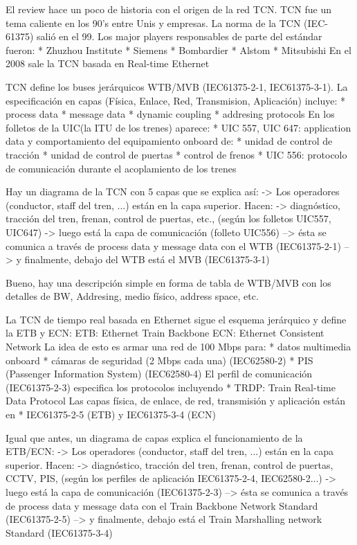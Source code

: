 \documentclass[
11pt, %
]{charter}
\begin{document}
El review hace un poco de historia con el origen de la red TCN.
TCN fue un tema caliente en los 90's entre Unis y empresas.
La norma de la TCN (IEC-61375) salió en el 99.
Los major players responsables de parte del estándar fueron:
* Zhuzhou Institute
* Siemens
* Bombardier
* Alstom
* Mitsubishi
En el 2008  sale la TCN basada en Real-time Ethernet


TCN define los buses jerárquicos WTB/MVB (IEC61375-2-1, IEC61375-3-1).
La especificación en capas (Física, Enlace, Red, Transmision, Aplicación) incluye:
* process data
* message data
* dynamic coupling
* addresing protocols
En los folletos de la UIC(la ITU de los trenes) aparece:
* UIC 557, UIC 647: application data y comportamiento del equipamiento onboard de:
* unidad de control de tracción
* unidad de control de puertas
* control de frenos
* UIC 556: protocolo de comunicación durante el acoplamiento de los trenes

Hay un diagrama de la TCN con 5 capas que se explica así:
-> Los operadores (conductor, staff del tren, ...) están en la capa superior. Hacen:
-> diagnóstico, tracción del tren, frenan, control de puertas, etc., (según los folletos UIC557, UIC647)
-> luego está la capa de comunicación  (folleto UIC556)
--> ésta se comunica a través de process data y message data con el WTB (IEC61375-2-1)
--> y finalmente, debajo del WTB está el MVB (IEC61375-3-1)

Bueno, hay una descripción simple en forma de tabla de WTB/MVB con los detalles de
BW, Addresing, medio físico, address space, etc.


La TCN de tiempo real basada en Ethernet sigue el esquema jerárquico y define la ETB y ECN:
ETB: Ethernet Train Backbone
ECN: Ethernet Consistent Network
La idea de esto es armar una red de  100 Mbps para:
* datos multimedia onboard
* cámaras de seguridad (2 Mbps cada una) (IEC62580-2)
* PIS (Passenger Information System) (IEC62580-4)
El perfil de comunicación (IEC61375-2-3) especifica los protocolos incluyendo
* TRDP: Train Real-time Data Protocol
Las capas física, de enlace, de red, transmisión y aplicación están en
* IEC61375-2-5 (ETB) y IEC61375-3-4 (ECN)

Igual que antes, un diagrama de capas explica el funcionamiento de la ETB/ECN:
-> Los operadores (conductor, staff del tren, ...) están en la capa superior. Hacen:
-> diagnóstico, tracción del tren, frenan, control de puertas, CCTV, PIS,
(según los perfiles de aplicación IEC61375-2-4, IEC62580-2...)
-> luego está la capa de comunicación  (IEC61375-2-3)
--> ésta se comunica a través de process data y message data con el
Train  Backbone Network Standard (IEC61375-2-5)
--> y finalmente, debajo está el Train Marshalling network Standard (IEC61375-3-4)
\end{document}
